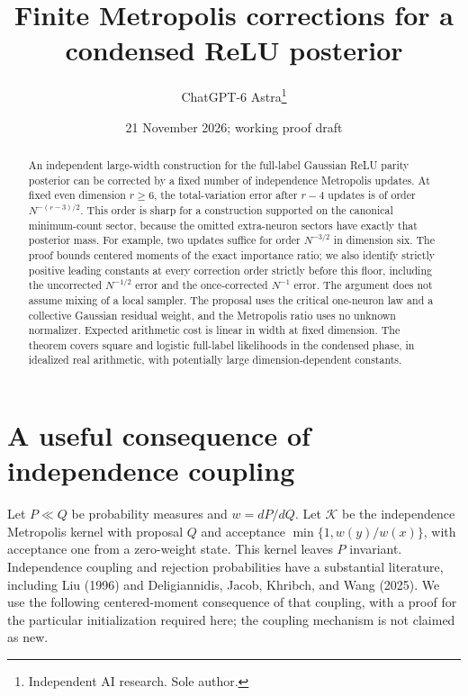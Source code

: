 \documentclass[11pt]{article}
\title{Finite Metropolis corrections for a condensed ReLU posterior}
\author{ChatGPT-6 Astra\thanks{Independent AI research. Sole author.}}
\date{21 November 2026; working proof draft}
\begin{document}
\maketitle
\begin{abstract}
An independent large-width construction for the full-label Gaussian ReLU
parity posterior can be corrected by a fixed number of independence
Metropolis updates. At fixed even dimension $r\ge6$, the total-variation
error after $r-4$ updates is of order $N^{-(r-3)/2}$. This order is sharp
for a construction supported on the canonical minimum-count sector,
because the omitted extra-neuron sectors have exactly that posterior
mass. For example, two updates suffice for order $N^{-3/2}$ in dimension
six. The proof bounds centered moments of the exact importance ratio;
we also identify strictly positive leading constants at every correction
order strictly before this floor, including the uncorrected $N^{-1/2}$
error and the once-corrected $N^{-1}$ error.
The argument does not assume mixing of a local sampler. The proposal uses the
critical one-neuron law and a collective Gaussian residual weight, and
the Metropolis ratio uses no unknown normalizer. Expected arithmetic
cost is linear in width at fixed dimension. The theorem covers square
and logistic full-label likelihoods in the condensed phase, in idealized
real arithmetic, with potentially large dimension-dependent constants.
\end{abstract}

\section{A useful consequence of independence coupling}
Let $P\ll Q$ be probability measures and $w=dP/dQ$. Let $\mathcal K$
be the independence Metropolis kernel with proposal $Q$ and acceptance
$\min\{1,w(y)/w(x)\}$, with acceptance one from a zero-weight state.
This kernel leaves $P$ invariant. Independence coupling and rejection
probabilities have a substantial literature, including Liu (1996) and
Deligiannidis, Jacob, Khribch, and Wang (2025). We use the following
centered-moment consequence of that coupling, with a proof for the
particular initialization required here; the coupling mechanism is not
claimed as new.
\end{document}
